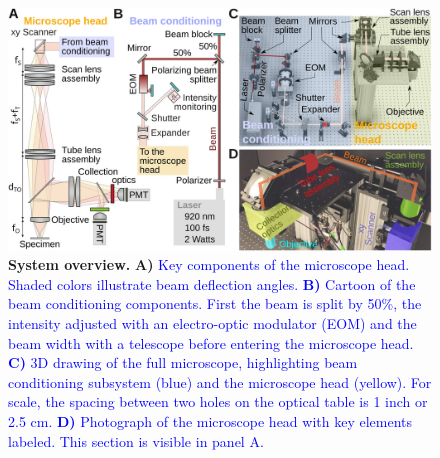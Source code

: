 \documentclass[10pt,letterpaper]{article}
\begin{document}
\begin{figure}[!t]
    \includegraphics[width=\textwidth]{fig1.jpg}
    \caption{{\bf System overview.} \textbf{A)} \textcolor{blue}{Key components of the microscope head. Shaded colors illustrate beam deflection angles. \textbf{B)} Cartoon of the beam conditioning components. First the beam is split by 50\%, the intensity adjusted with an electro-optic modulator (EOM) and the beam width with a telescope before entering the microscope head. \textbf{C)} 3D drawing of the full microscope, highlighting beam conditioning subsystem (blue) and the microscope head (yellow). For scale, the spacing between two holes on the optical table is 1 inch or 2.5 cm. \textbf{D)} Photograph of the microscope head with key elements labeled. This section is visible in panel A.}}
    \label{fig1}
\end{figure}
\end{document}
